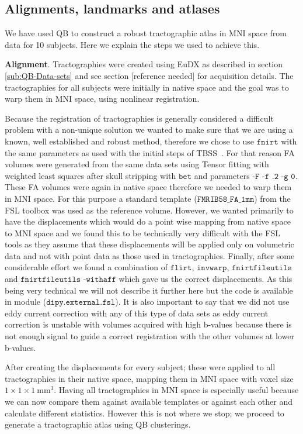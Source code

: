 \documentclass[preprint,authoryear,a4paper,10pt,onecolumn]{elsarticle}
\begin{document}
\subsection{Alignments, landmarks and atlases\label{sub:Atlases-made-easy}}

We have used QB to construct a robust tractographic atlas in MNI space
from data for 10 subjects. Here we explain the steps we used to achieve
this.

\textbf{Alignment}. Tractographies were created using EuDX as described
in section \ref{sub:QB-Data-sets} and see section
[reference needed] for acquisition details. The
tractographies for all subjects were initially in native space and the
goal was to warp them in MNI space, using nonlinear registration.

Because the registration of tractographies is generally considered a
difficult problem with a non-unique solution we wanted to make sure that
we are using a known, well established and robust method, therefore we
chose to use $\texttt{fnirt}$ with the same parameters as used with the
initial steps of TBSS~\citep{Smith2006NeuroImage}. For that reason FA
volumes were generated from the same data sets using Tensor fitting with
weighted least squares after skull stripping with $\texttt{bet}$ and
parameters $\texttt{-F -f .2 -g 0}$. These FA volumes were again in
native space therefore we needed to warp them in MNI space. For this
purpose a standard template ($\texttt{FMRIB58\_FA\_1mm}$) from the FSL
toolbox was used as the reference volume. However, we wanted primarily
to have the displacements which would do a point wise mapping from
native space to MNI space and we found this to be technically very
difficult with the FSL tools as they assume that these displacements
will be applied only on volumetric data and not with point data as those
used in tractographies. Finally, after some considerable effort we found
a combination of $\texttt{flirt}$, $\texttt{invwarp}$,
$\texttt{fnirtfileutils}$ and $\texttt{fnirtfileutils -withaff}$ which
gave us the correct displacements. As this being very technical we will
not describe it further here but the code is available in module
($\texttt{dipy.external.fsl}$). It is also important to say that we
did not use eddy current correction with any of this type of data sets as
eddy current correction is unstable with volumes acquired with high b-values because there
is not enough signal to guide a correct registration with the other
volumes at lower b-values.

After creating the displacements for every subject; these were applied
to all tractographies in their native space, mapping them in MNI
space with voxel size $1\times1\times1~\textrm{mm}^{3}$. Having all
tractographies in MNI space is especially useful because we can now
compare them against available templates or against each other and
calculate different statistics. However this is not where we stop; we
proceed to generate a tractographic atlas using QB clusterings.
\end{document}
